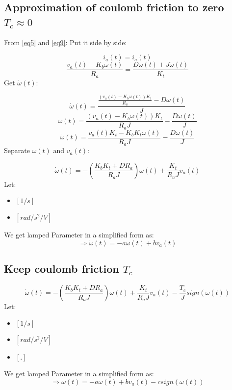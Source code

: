 \documentclass[12pt,a4paper]{article}
\begin{document}
	\subsection{Approximation of coulomb friction to zero \(T_c \approx 0\)}
	
	From \autoref{eq5} and \autoref{eq9}: Put it side by side:
	
	\[i_a(t) = i_a(t)\]
	\[\frac{v_a(t) - K_b \omega(t)}{R_a} = \frac{D\omega(t) + J \dot{\omega}(t)}{K_t}\]
	Get \(\dot{\omega}(t)\):
	
	\[\dot{\omega}(t) = \frac{\frac{(v_a(t) - K_b \omega(t))K_t}{R_a} - D\omega(t)}{J}\]
	\[\dot{\omega}(t) = \frac{(v_a(t) - K_b \omega(t))K_t}{R_a J} - \frac{D\omega(t)}{J}\]
	\[\dot{\omega}(t) = \frac{v_a(t) K_t - K_b K_t\omega(t)}{R_a J} - \frac{D\omega(t)}{J}\]
	Separate \(\omega(t)\) and \(v_a(t)\):
	
	\begin{equation}
		\boxed{\dot{\omega}(t) = - (\frac{K_b K_t + D R_a}{R_a J})\omega(t) + \frac{K_t}{R_a J}v_a(t)}
		\label{eq11}
	\end{equation}
	Let:
	\begin{itemize}
		\item { \([1/s]\) }
		\item { \([rad/s^2/V]\) }
	\end{itemize}
	We get lamped Parameter in a simplified form as:
	\begin{equation}
		\Rightarrow \boxed{\dot{\omega}(t) = - a\omega(t) + bv_a(t)}
		\label{eq12}
	\end{equation}
	
	
	\subsection{Keep coulomb friction \(T_c\)}
	\begin{equation}
		\boxed{\dot{\omega}(t) = - (\frac{K_b K_t + D R_a}{R_a J})\omega(t) + \frac{K_t}{R_a J}v_a(t) - \frac{T_c}{J}sign(\omega(t))}
		\label{eq13}
	\end{equation}
	Let:
	\begin{itemize}
		\item { \([1/s]\) }
		\item { \([rad/s^2/V]\) }
		\item { \([.]\) }
	\end{itemize}
	We get lamped Parameter in a simplified form as:
	\begin{equation}
		\Rightarrow \boxed{\dot{\omega}(t) = - a\omega(t) + bv_a(t) - csign(\omega(t))}
		\label{eq14}
	\end{equation}
	
\end{document}
